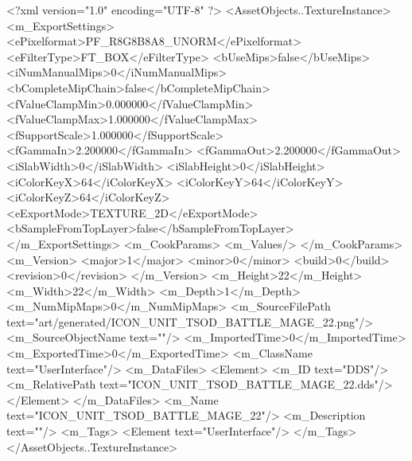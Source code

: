 <?xml version="1.0" encoding="UTF-8" ?>
<AssetObjects..TextureInstance>
	<m_ExportSettings>
		<ePixelformat>PF_R8G8B8A8_UNORM</ePixelformat>
		<eFilterType>FT_BOX</eFilterType>
		<bUseMips>false</bUseMips>
		<iNumManualMips>0</iNumManualMips>
		<bCompleteMipChain>false</bCompleteMipChain>
		<fValueClampMin>0.000000</fValueClampMin>
		<fValueClampMax>1.000000</fValueClampMax>
		<fSupportScale>1.000000</fSupportScale>
		<fGammaIn>2.200000</fGammaIn>
		<fGammaOut>2.200000</fGammaOut>
		<iSlabWidth>0</iSlabWidth>
		<iSlabHeight>0</iSlabHeight>
		<iColorKeyX>64</iColorKeyX>
		<iColorKeyY>64</iColorKeyY>
		<iColorKeyZ>64</iColorKeyZ>
		<eExportMode>TEXTURE_2D</eExportMode>
		<bSampleFromTopLayer>false</bSampleFromTopLayer>
	</m_ExportSettings>
	<m_CookParams>
		<m_Values/>
	</m_CookParams>
	<m_Version>
		<major>1</major>
		<minor>0</minor>
		<build>0</build>
		<revision>0</revision>
	</m_Version>
	<m_Height>22</m_Height>
	<m_Width>22</m_Width>
	<m_Depth>1</m_Depth>
	<m_NumMipMaps>0</m_NumMipMaps>
	<m_SourceFilePath text="art/generated/ICON_UNIT_TSOD_BATTLE_MAGE_22.png"/>
	<m_SourceObjectName text=""/>
	<m_ImportedTime>0</m_ImportedTime>
	<m_ExportedTime>0</m_ExportedTime>
	<m_ClassName text="UserInterface"/>
	<m_DataFiles>
		<Element>
			<m_ID text="DDS"/>
			<m_RelativePath text="ICON_UNIT_TSOD_BATTLE_MAGE_22.dds"/>
		</Element>
	</m_DataFiles>
	<m_Name text="ICON_UNIT_TSOD_BATTLE_MAGE_22"/>
	<m_Description text=""/>
	<m_Tags>
		<Element text="UserInterface"/>
	</m_Tags>
</AssetObjects..TextureInstance>
